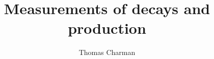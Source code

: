 \documentclass[a4paper,12pt, oneside]{memoir}
\begin{document}
\title{Measurements of \Hbb decays and \VH production}

\author{Thomas Charman}
\submitdate{\today}

\doublespacing
\maketitle



\clearpage
\newpage
% 

\setcounter{tocdepth}{1}
\tableofcontents
\clearpage
\newpage
\listoffigures
\clearpage
\newpage
\listoftables














\clearpage
\appendix
\begin{appendices}
%
%



%
\end{appendices}
\end{document}
